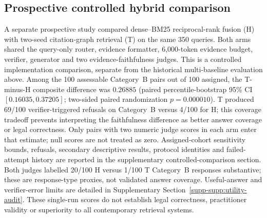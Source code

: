 \subsection{Prospective controlled hybrid comparison}
\label{subsec:matched-comparison}
A separate prospective study compared dense--BM25 reciprocal-rank fusion (H) with two-seed citation-graph retrieval (T) on the same 350 queries. Both arms shared the query-only router, evidence formatter, 6,000-token evidence budget, verifier, generator and two evidence-faithfulness judges. This is a controlled implementation comparison, separate from the historical multi-baseline evaluation above. Among the 100 assessable Category~B pairs out of 100 assigned, the T-minus-H composite difference was $0.26885$ (paired percentile-bootstrap 95\% CI $[0.16035, 0.37205]$; two-sided paired randomization $p=0.000010$). T produced 69/100 verifier-triggered refusals on Category~B versus 4/100 for H; this coverage tradeoff prevents interpreting the faithfulness difference as better answer coverage or legal correctness. Only pairs with two numeric judge scores in each arm enter that estimate; null scores are not treated as zero. Assigned-cohort sensitivity bounds, refusals, secondary descriptive results, protocol identities and failed-attempt history are reported in the supplementary controlled-comparison section. Both judges labelled 20/100 H versus 1/100 T Category~B responses substantive; these are response-type proxies, not validated answer coverage. Useful-answer and verifier-error limits are detailed in Supplementary Section~\ref{supp-supp:utility-audit}. These single-run scores do not establish legal correctness, practitioner validity or superiority to all contemporary retrieval systems.
